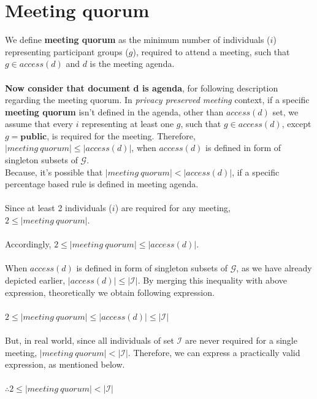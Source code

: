 \documentclass{article}
\begin{document}
\section{Meeting quorum}
\noindent
We define \textbf{meeting quorum} as the minimum number of individuals ($i$) representing participant groups ($g$), required to attend a meeting, such that $g \in access(d)$ and $d$ is the meeting agenda. \\ \\
\textbf{Now consider that document d is agenda}, for following description regarding the meeting quorum. In \textit{privacy preserved meeting} context, if a specific \textbf{meeting quorum} isn't defined in the agenda, other than $access(d)$ set, we assume that every $i$ representing at least one $g$, such that $g \in access(d)$, except $g = \textbf{public}$, is required for the meeting. Therefore, $|meeting\ quorum| \leq |access(d)|$, when $access(d)$ is defined in form of singleton subsets of $\mathcal{G}$.\\
Because, it's possible that $|meeting\ quorum| < |access(d)|$, if a specific percentage based rule is defined in meeting agenda. \\ \\
Since at least 2 individuals ($i$) are required for any meeting, $2 \leq |meeting\ quorum|$. \\ \\
Accordingly, $2 \leq |meeting\ quorum| \leq |access(d)|$. \\ \\
When $access(d)$ is defined in form of singleton subsets of $\mathcal{G}$, as we have already depicted earlier, $|access(d)| \leq |\mathcal{I}|$. By merging this inequality with above expression, theoretically we obtain following expression.\\ \\
$2 \leq |meeting\ quorum| \leq |access(d)| \leq |\mathcal{I}|$  \\ \\
\noindent
But, in real world, since all individuals of set $\mathcal{I}$ are never required for a single meeting, $|meeting\ quorum| < |\mathcal{I}|$. Therefore, we can express a practically valid expression, as mentioned below.\\ \\
$\therefore 2 \leq |meeting\ quorum| < |\mathcal{I}|$ \\ \\
\end{document}

